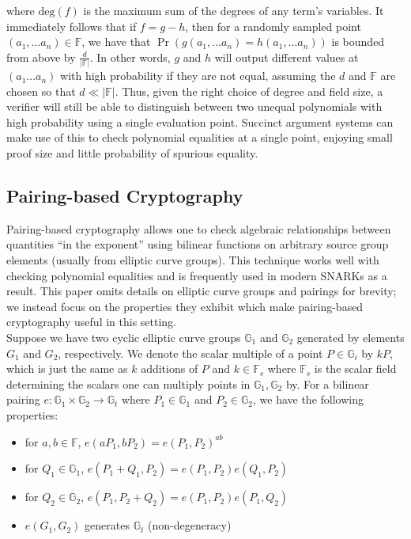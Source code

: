 \noindent where $\text{deg}(f)$ is the maximum sum of the degrees of any term's variables. It immediately follows that if $f = g-h$, then for a randomly sampled point $(a_1, \dots a_n) \in \mathbb{F}$, we have that $\Pr(g(a_1, \dots a_n) = h(a_1, \dots a_n))$ is bounded from above by $\frac{d}{|\mathbb{F}|}$. In other words, $g$ and $h$ will output different values at $(a_1 \dots a_n)$ with high probability if they are not equal, assuming the $d$ and $\mathbb{F}$ are chosen so that $d \ll |\mathbb{F}|$. Thus, given the right choice of degree and field size, a verifier will still be able to distinguish between two unequal polynomials with high probability using a single evaluation point. Succinct argument systems can make use of this to check polynomial equalities at a single point, enjoying small proof size and little probability of spurious equality.

\subsection{Pairing-based Cryptography}\label{subsec:pairing}
\noindent Pairing-based cryptography \cite{ibepairings} allows one to check algebraic relationships between quantities ``in the exponent'' using bilinear functions on arbitrary source group elements (usually from elliptic curve groups). This technique works well with checking polynomial equalities and is frequently used in modern SNARKs as a result.  This paper omits details on elliptic curve groups and pairings for brevity; we instead focus on the properties they exhibit which make pairing-based cryptography useful in this setting.\\

\noindent Suppose we have two cyclic elliptic curve groups $\mathbb{G}_1$ and $\mathbb{G}_2$ generated by elements $G_1$ and $G_2$, respectively. We denote the scalar multiple of a point $P \in \mathbb{G}_i$ by $kP$, which is just the same as $k$ additions of $P$ and $k \in \mathbb{F}_s$ where $\mathbb{F}_s$ is the scalar field determining the scalars one can multiply points in $\mathbb{G}_1, \mathbb{G}_2$ by. For a bilinear pairing $e: \mathbb{G}_1 \times \mathbb{G}_2 \to \mathbb{G}_t$ where $P_1 \in \mathbb{G}_1$ and $P_2 \in \mathbb{G}_2$, we have the following properties:
\begin{itemize}
    \item for $a, b \in \mathbb{F}$, $e(aP_1, bP_2) = e(P_1, P_2)^{ab}$
    \item for $Q_1 \in \mathbb{G}_1$, $e(P_1+Q_1, P_2) = e(P_1, P_2) e(Q_1, P_2)$
    \item for $Q_2 \in \mathbb{G}_2$, $e(P_1, P_2+Q_2) = e(P_1, P_2) e(P_1, Q_2)$
    \item $e(G_1, G_2)$ generates $\mathbb{G}_t$ (non-degeneracy)
\end{itemize}


